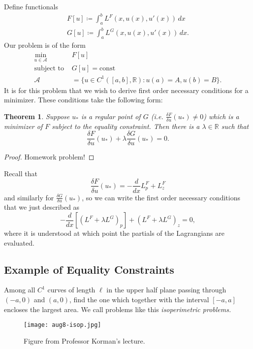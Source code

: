 \documentclass[11pt]{article}
\newcommand{\R}{\mathbb{R}}
\newtheorem{theorem}{Theorem}[section]
\begin{document}
Define functionals
\begin{align*}
F[u] \coloneqq \int_a^b L^F(x, u(x), u'(x)) \, dx \\
G[u] \coloneqq \int_a^b L^G(x, u(x), u'(x)) \, dx.
\end{align*}
Our problem is of the form
\begin{align*}
\min_{u \in \mathcal{A}} \qquad &F[u] \\
\text{subject to } &G[u] = \mathrm{const} \\
\mathcal{A} &= \{ u \in C^1([a, b], \R) : u(a) = A, u(b) = B \}.
\end{align*}
It is for this problem that we wish to derive first order necessary conditions for a minimizer. These conditions take the following form:
\begin{theorem}
Suppose $u_*$ is a \emph{regular point} of $G$ (i.e. $\frac{\delta F}{\delta u}(u_*) \neq 0$) which is a minimizer of $F$ subject to the equality constraint. Then there is a $\lambda \in \R$ such that
\[
\frac{\delta F}{\delta u}(u_*) + \lambda \frac{\delta G}{\delta u}(u_*) = 0.
\]
\end{theorem}
\begin{proof}
Homework problem!
\end{proof}

Recall that
\[
\frac{\delta F}{\delta u}(u_*) = -\frac{d}{dx} L_p^F + L_z^F
\]
and similarly for $\frac{\delta G}{\delta u}(u_*)$, so we can write the first order necessary conditions that we just described as
\[
-\frac{d}{dx} \left[ (L^F + \lambda L^G)_p \right] + \left( L^F + \lambda L^G \right)_z = 0,
\]
where it is understood at which point the partials of the Lagrangians are evaluated.

\subsection{Example of Equality Constraints}

Among all $C^1$ curves of length $\ell$ in the upper half plane passing through $(-a,0)$ and $(a, 0)$, find the one which together with the interval $[-a,a]$ encloses the largest area. We call problems like this \emph{isoperimetric problems.}

\begin{figure}[H]
\texttt{[image: aug8-isop.jpg]}
\centering
\caption{Figure from Professor Korman's lecture.}
\end{figure}
\end{document}
